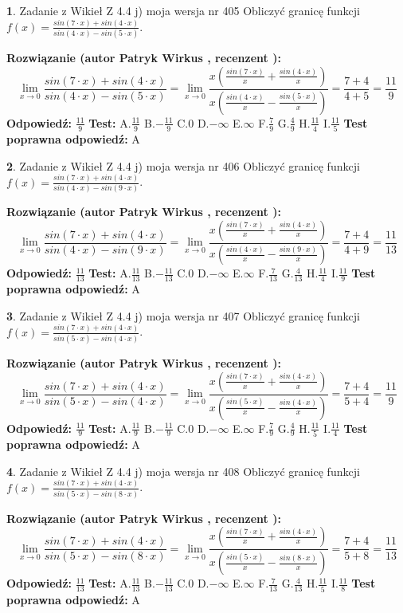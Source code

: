 \documentclass[12pt, a4paper]{article}
\theoremstyle{definition} %
\newtheorem{zad}{}
\newcommand{\zadStart}[1]{\begin{zad}#1\newline}
\newcommand{\zadStop}{\end{zad}}
\newcommand{\rozwStart}[2]{\noindent \textbf{Rozwiązanie (autor #1 , recenzent #2): }\newline}
\newcommand{\rozwStop}{\newline}
\newcommand{\odpStart}{\noindent \textbf{Odpowiedź:}\newline}
\newcommand{\odpStop}{\newline}
\newcommand{\testStart}{\noindent \textbf{Test:}\newline}
\newcommand{\testStop}{\newline}
\newcommand{\kluczStart}{\noindent \textbf{Test poprawna odpowiedź:}\newline}
\newcommand{\kluczStop}{\newline}
\begin{document}
\zadStart{Zadanie z Wikieł Z 4.4 j) moja wersja nr 405}
Obliczyć granicę funkcji $f(x)=\frac{sin(7\cdot x) +sin(4\cdot x)}{sin(4\cdot x) -sin(5\cdot x)}$.
\zadStop
\rozwStart{Patryk Wirkus}{}
$$\lim\limits_{x\to 0}\frac{sin(7\cdot x) +sin(4\cdot x)}{sin(4\cdot x) -sin(5\cdot x)}=\lim\limits_{x\to 0}\frac{x(\frac{sin(7\cdot x)}{x}+\frac{sin(4\cdot x)}{x})}{x(\frac{sin(4\cdot x)}{x}-\frac{sin(5\cdot x)}{x})}=\frac{7+4}{4+5} = \frac{11}{9}$$
\rozwStop
\odpStart
$\frac{11}{9}$
\odpStop
\testStart
A.$\frac{11}{9}$
B.$-\frac{11}{9}$
C.$0$
D.$-\infty$
E.$\infty$
F.$\frac{7}{9}$
G.$\frac{4}{9}$
H.$\frac{11}{4}$
I.$\frac{11}{5}$
\testStop
\kluczStart
A
\kluczStop



\zadStart{Zadanie z Wikieł Z 4.4 j) moja wersja nr 406}
Obliczyć granicę funkcji $f(x)=\frac{sin(7\cdot x) +sin(4\cdot x)}{sin(4\cdot x) -sin(9\cdot x)}$.
\zadStop
\rozwStart{Patryk Wirkus}{}
$$\lim\limits_{x\to 0}\frac{sin(7\cdot x) +sin(4\cdot x)}{sin(4\cdot x) -sin(9\cdot x)}=\lim\limits_{x\to 0}\frac{x(\frac{sin(7\cdot x)}{x}+\frac{sin(4\cdot x)}{x})}{x(\frac{sin(4\cdot x)}{x}-\frac{sin(9\cdot x)}{x})}=\frac{7+4}{4+9} = \frac{11}{13}$$
\rozwStop
\odpStart
$\frac{11}{13}$
\odpStop
\testStart
A.$\frac{11}{13}$
B.$-\frac{11}{13}$
C.$0$
D.$-\infty$
E.$\infty$
F.$\frac{7}{13}$
G.$\frac{4}{13}$
H.$\frac{11}{4}$
I.$\frac{11}{9}$
\testStop
\kluczStart
A
\kluczStop



\zadStart{Zadanie z Wikieł Z 4.4 j) moja wersja nr 407}
Obliczyć granicę funkcji $f(x)=\frac{sin(7\cdot x) +sin(4\cdot x)}{sin(5\cdot x) -sin(4\cdot x)}$.
\zadStop
\rozwStart{Patryk Wirkus}{}
$$\lim\limits_{x\to 0}\frac{sin(7\cdot x) +sin(4\cdot x)}{sin(5\cdot x) -sin(4\cdot x)}=\lim\limits_{x\to 0}\frac{x(\frac{sin(7\cdot x)}{x}+\frac{sin(4\cdot x)}{x})}{x(\frac{sin(5\cdot x)}{x}-\frac{sin(4\cdot x)}{x})}=\frac{7+4}{5+4} = \frac{11}{9}$$
\rozwStop
\odpStart
$\frac{11}{9}$
\odpStop
\testStart
A.$\frac{11}{9}$
B.$-\frac{11}{9}$
C.$0$
D.$-\infty$
E.$\infty$
F.$\frac{7}{9}$
G.$\frac{4}{9}$
H.$\frac{11}{5}$
I.$\frac{11}{4}$
\testStop
\kluczStart
A
\kluczStop



\zadStart{Zadanie z Wikieł Z 4.4 j) moja wersja nr 408}
Obliczyć granicę funkcji $f(x)=\frac{sin(7\cdot x) +sin(4\cdot x)}{sin(5\cdot x) -sin(8\cdot x)}$.
\zadStop
\rozwStart{Patryk Wirkus}{}
$$\lim\limits_{x\to 0}\frac{sin(7\cdot x) +sin(4\cdot x)}{sin(5\cdot x) -sin(8\cdot x)}=\lim\limits_{x\to 0}\frac{x(\frac{sin(7\cdot x)}{x}+\frac{sin(4\cdot x)}{x})}{x(\frac{sin(5\cdot x)}{x}-\frac{sin(8\cdot x)}{x})}=\frac{7+4}{5+8} = \frac{11}{13}$$
\rozwStop
\odpStart
$\frac{11}{13}$
\odpStop
\testStart
A.$\frac{11}{13}$
B.$-\frac{11}{13}$
C.$0$
D.$-\infty$
E.$\infty$
F.$\frac{7}{13}$
G.$\frac{4}{13}$
H.$\frac{11}{5}$
I.$\frac{11}{8}$
\testStop
\kluczStart
A
\kluczStop
\end{document}
